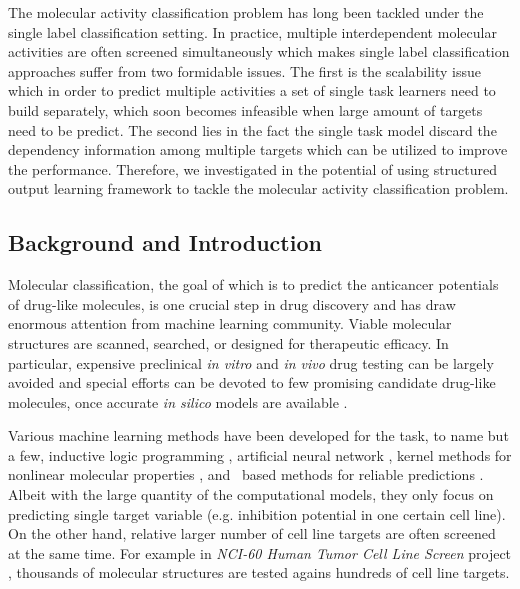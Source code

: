 {The molecular activity classification problem has long been tackled under the single label classification setting.
In practice, multiple interdependent molecular activities are often screened simultaneously which makes single label classification approaches suffer from two formidable issues.
The first is the scalability issue which in order to predict multiple activities a set of single task learners need to build separately, which soon becomes infeasible when large amount of targets need to be predict.
The second lies in the fact the single task model discard the dependency information among multiple targets which can be utilized to improve the performance.
Therefore, we investigated in  the potential of using structured output learning framework to tackle the molecular activity classification problem.

\subsection{Background and Introduction}

Molecular classification, the goal of which is to predict the anticancer potentials of drug-like molecules, is one crucial step in drug discovery and has draw enormous attention from machine learning community.
Viable molecular structures are scanned, searched, or designed for therapeutic efficacy.
In particular, expensive preclinical \textit{in vitro} and \textit{in vivo} drug testing can be largely avoided and special efforts can be devoted to few promising candidate drug-like molecules, once accurate \textit{in silico} models are available \citep{Burbidg01drug}.

Various machine learning methods have been developed for the task, to name but a few, inductive logic programming \citep{King96structure}, artificial neural network \citep{Bernazzani06predicting}, kernel methods for nonlinear molecular properties \citep{Trotter01drug,Ralaivola05graph,Swamidass05kernel,Ceroni07classification}, and \svm\ based methods for reliable predictions \citep{Trotter01drug,Byvatov03comparison,Xue04effect}.
Albeit with the large quantity of the computational models, they only focus on predicting single target variable (e.g. inhibition potential in one certain cell line). 
On the other hand, relative larger number of cell line targets are often screened at the same time.
For example in \textit{NCI-60 Human Tumor Cell Line Screen} project \citep{Shoemaker06the}, thousands of molecular structures are tested agains hundreds of cell line targets.


}

